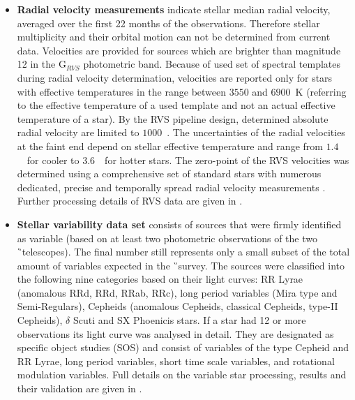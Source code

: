 \begin{itemize}
	\item \textbf{Radial velocity measurements} indicate stellar median radial velocity, averaged over the first 22 months of the observations. Therefore stellar multiplicity and their orbital motion can not be determined from current data. Velocities are provided for sources which are brighter than magnitude 12 in the G$_{RVS}$ photometric band. Because of used set of spectral templates during radial velocity determination, velocities are reported only for stars with effective temperatures in the range between $3550$ and $6900$~K (referring to the effective temperature of a used template and not an actual effective temperature of a star). By the RVS pipeline design, determined absolute radial velocity are limited to $1000$~\kms. The uncertainties of the radial velocities at the faint end depend on stellar effective temperature and range from $1.4$~\kms\ for cooler to $3.6$~\kms\ for hotter stars. The zero-point of the RVS velocities was determined using a comprehensive set of standard stars with numerous dedicated, precise and temporally spread radial velocity measurements \citep{2018A&A...616A...7S}. Further processing details of RVS data are given in \citet{2018A&A...616A...6S}.
	
	\item \textbf{Stellar variability data set} consists of sources that were firmly identified as variable (based on at least two photometric observations of the two \G\ telescopes). The final number still represents only a small subset of the total amount of variables expected in the \G\ survey. The sources were classified into the following nine categories based on their light curves: RR Lyrae (anomalous RRd, RRd, RRab, RRc), long period variables (Mira type and Semi-Regulars), Cepheids (anomalous Cepheids, classical Cepheids, type-II Cepheids), $\delta$ Scuti and SX Phoenicis stars. If a star had 12 or more observations its light curve was analysed in detail. They are designated as specific object studies (SOS) and consist of variables of the type Cepheid
	and RR Lyrae, long period variables, short time scale variables, and rotational modulation variables. Full details on the variable star processing, results and their validation are given in \citet{2018A&A...618A..30H, 2018A&A...618A..58M, 2018A&A...620A.127M, 2019A&A...622A..60C}.
	

\end{itemize}
